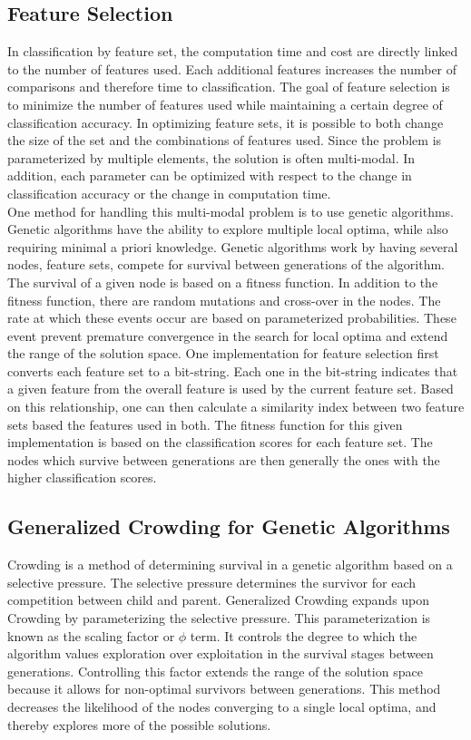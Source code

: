 \documentclass{sig-alternate}
\begin{document}
\subsection{Feature Selection}
In classification by feature set, the computation time and cost are directly linked to the number of features used. Each additional features increases the number of comparisons and therefore time to classification\cite{features}. The goal of feature selection is to minimize the number of features used while maintaining a certain degree of classification accuracy. In optimizing feature sets, it is possible to both change the size of the set and the combinations of features used. Since the problem is parameterized by multiple elements, the solution is often multi-modal. In addition, each parameter can be optimized with respect to the change in classification accuracy or the change in computation time.\\
\indent One method for handling this multi-modal problem is to use genetic algorithms\cite{features}. Genetic algorithms have the ability to explore multiple local optima, while also requiring minimal a priori knowledge. Genetic algorithms work by having several nodes, feature sets, compete for survival between generations of the algorithm. The survival of a given node is based on a fitness function. In addition to the fitness function, there are random mutations and cross-over in the nodes. The rate at which these events occur are based on parameterized probabilities. These event prevent premature convergence in the search for local optima and extend the range of the solution space\cite{galan:feedback}. One implementation for feature selection first converts each feature set to a bit-string\cite{features}. Each one in the bit-string indicates that a given feature from the overall feature is used by the current feature set. Based on this relationship, one can then calculate a similarity index between two feature sets based the features used in both. The fitness function for this given implementation is based on the classification scores for each feature set. The nodes which survive between generations are then generally the ones with the higher classification scores.

\subsection{Generalized Crowding for Genetic Algorithms}
Crowding is a method of determining survival in a genetic algorithm based on a selective pressure. The selective pressure determines the survivor for each competition between child and parent\cite{galan:feedback}. Generalized Crowding expands upon Crowding by parameterizing the selective pressure\cite{galan:feedback}. This parameterization is known as the scaling factor or $\phi$ term. It controls the degree to which the algorithm values exploration over exploitation in the survival stages between generations\cite{galan:feedback}. Controlling this factor extends the range of the solution space because it allows for non-optimal survivors between generations. This method decreases the likelihood of the nodes converging to a single local optima, and thereby explores more of the possible solutions.
\end{document}
